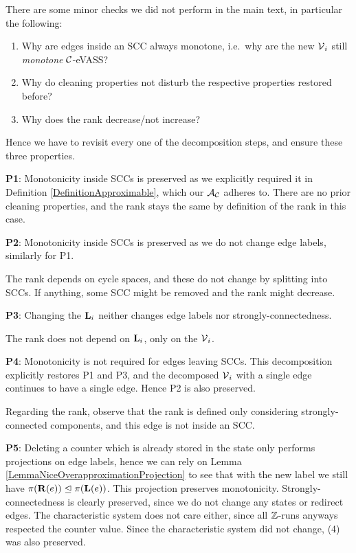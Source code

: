 There are some minor checks we did not perform in the main text, in particular the following:

\begin{enumerate}
\item Why are edges inside an SCC always monotone, i.e.\ why are the new \(\operatorname{\mathcal{V}}_i\) still \emph{monotone} \(\mathcal{C}\)-eVASS?
\item Why do cleaning properties not disturb the respective properties restored before?
\item Why does the rank decrease/not increase?
\end{enumerate}

Hence we have to revisit every one of the decomposition steps, and ensure these three properties.

\textbf{P1}: Monotonicity inside SCCs is preserved as we explicitly required it in Definition \ref{DefinitionApproximable}, which our \(\mathcal{A}_{\mathcal{C}}\) adheres to. There are no prior cleaning properties, and the rank stays the same by definition of the rank in this case. 

\textbf{P2}: Monotonicity inside SCCs is preserved as we do not change edge labels, similarly for P1.

The rank depends on cycle spaces, and these do not change by splitting into SCCs. If anything, some SCC might be removed and the rank might decrease.

\textbf{P3}: Changing the \(\mathbf{L}_i\) neither changes edge labels nor strongly-connectedness. 

The rank does not depend on \(\mathbf{L}_i\), only on the \(\operatorname{\mathcal{V}}_i\).

\textbf{P4}: Monotonicity is not required for edges leaving SCCs. This decomposition explicitly restores P1 and P3, and the decomposed \(\operatorname{\mathcal{V}}_i\) with a single edge continues to have a single edge. Hence P2 is also preserved. 

Regarding the rank, observe that the rank is defined only considering strongly-connected components, and this edge is not inside an SCC.

\textbf{P5}: Deleting a counter which is already stored in the state only performs projections on edge labels, hence we can rely on Lemma \ref{LemmaNiceOverapproximationProjection} to see that with the new label we still have \(\pi(\mathbf{R}(e)) \trianglelefteq \pi(\mathbf{L}(e))\). This projection preserves monotonicity. Strongly-connectedness is clearly preserved, since we do not change any states or redirect edges. The characteristic system does not care either, since all \(\mathbb{Z}\)-runs anyways respected the counter value. Since the characteristic system did not change, (4) was also preserved.

